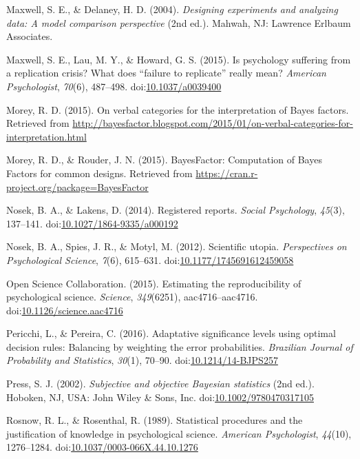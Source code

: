 \documentclass[english,man]{apa6}
\theoremstyle{definition}
\theoremstyle{definition}
\theoremstyle{definition}
\theoremstyle{remark}
\begin{document}
\hypertarget{ref-Maxwell2004}{}
Maxwell, S. E., \& Delaney, H. D. (2004). \emph{Designing experiments
and analyzing data: A model comparison perspective} (2nd ed.). Mahwah,
NJ: Lawrence Erlbaum Associates.

\hypertarget{ref-Maxwell2015}{}
Maxwell, S. E., Lau, M. Y., \& Howard, G. S. (2015). Is psychology
suffering from a replication crisis? What does ``failure to replicate''
really mean? \emph{American Psychologist}, \emph{70}(6), 487--498.
doi:\href{https://doi.org/10.1037/a0039400}{10.1037/a0039400}

\hypertarget{ref-Morey2015c}{}
Morey, R. D. (2015). On verbal categories for the interpretation of
Bayes factors. Retrieved from
\url{http://bayesfactor.blogspot.com/2015/01/on-verbal-categories-for-interpretation.html}

\hypertarget{ref-Morey2015b}{}
Morey, R. D., \& Rouder, J. N. (2015). BayesFactor: Computation of Bayes
Factors for common designs. Retrieved from
\url{https://cran.r-project.org/package=BayesFactor}

\hypertarget{ref-Nosek2014}{}
Nosek, B. A., \& Lakens, D. (2014). Registered reports. \emph{Social
Psychology}, \emph{45}(3), 137--141.
doi:\href{https://doi.org/10.1027/1864-9335/a000192}{10.1027/1864-9335/a000192}

\hypertarget{ref-Nosek2012}{}
Nosek, B. A., Spies, J. R., \& Motyl, M. (2012). Scientific utopia.
\emph{Perspectives on Psychological Science}, \emph{7}(6), 615--631.
doi:\href{https://doi.org/10.1177/1745691612459058}{10.1177/1745691612459058}

\hypertarget{ref-OpenScienceCollaboration2015}{}
Open Science Collaboration. (2015). Estimating the reproducibility of
psychological science. \emph{Science}, \emph{349}(6251),
aac4716--aac4716.
doi:\href{https://doi.org/10.1126/science.aac4716}{10.1126/science.aac4716}

\hypertarget{ref-Pericchi2016}{}
Pericchi, L., \& Pereira, C. (2016). Adaptative significance levels
using optimal decision rules: Balancing by weighting the error
probabilities. \emph{Brazilian Journal of Probability and Statistics},
\emph{30}(1), 70--90.
doi:\href{https://doi.org/10.1214/14-BJPS257}{10.1214/14-BJPS257}

\hypertarget{ref-Press2002}{}
Press, S. J. (2002). \emph{Subjective and objective Bayesian statistics}
(2nd ed.). Hoboken, NJ, USA: John Wiley \& Sons, Inc.
doi:\href{https://doi.org/10.1002/9780470317105}{10.1002/9780470317105}

\hypertarget{ref-Rosnow1989}{}
Rosnow, R. L., \& Rosenthal, R. (1989). Statistical procedures and the
justification of knowledge in psychological science. \emph{American
Psychologist}, \emph{44}(10), 1276--1284.
doi:\href{https://doi.org/10.1037/0003-066X.44.10.1276}{10.1037/0003-066X.44.10.1276}
\end{document}
